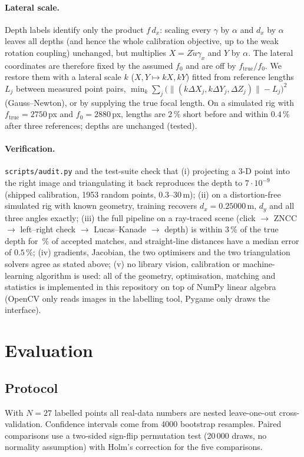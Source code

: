 \documentclass[11pt,a4paper]{article}
\newcommand{\code}[1]{\texttt{#1}}
\begin{document}
\paragraph{Lateral scale.} Depth labels identify only the product $f\,d_x$: scaling every $\gamma$ by $\alpha$ and $d_x$ by $\alpha$
leaves all depths (and hence the whole calibration objective, up to the weak rotation coupling) unchanged, but
multiplies $X=Z\tilde u\gamma_x$ and $Y$ by $\alpha$. The lateral coordinates are therefore fixed by the assumed $f_0$ and are
off by $f_\text{true}/f_0$. We restore them with a lateral scale $k$ ($X,Y\mapsto kX,kY$) fitted from reference lengths
$L_j$ between measured point pairs, $\min_k\sum_j\big(\|(k\Delta X_j,k\Delta Y_j,\Delta Z_j)\|-L_j\big)^2$ (Gauss--Newton), or
by supplying the true focal length. On a simulated rig with $f_\text{true}=2750$\,px and $f_0=2880$\,px, lengths are
$2\,\%$ short before and within $0.4\,\%$ after three references; depths are unchanged (tested).

\paragraph{Verification.} \code{scripts/audit.py} and the test-suite check that
(i) projecting a 3-D point into the right image and triangulating it back reproduces the depth to $7\cdot10^{-9}$
(shipped calibration, 1953 random points, 0.3--30\,m);
(ii) on a distortion-free simulated rig with known geometry, training recovers $d_x=0.25000$\,m, $d_y$ and all three
angles exactly;
(iii) the full pipeline on a ray-traced scene (click $\to$ ZNCC $\to$ left--right check $\to$ Lucas--Kanade $\to$ depth)
is within 3\,\% of the true depth for \MatchPrec\,\% of accepted matches, and straight-line distances have a median
error of $0.5\,\%$;
(iv) gradients, Jacobian, the two optimisers and the two triangulation solvers agree as stated above;
(v) no library vision, calibration or machine-learning algorithm is used: all of the geometry, optimisation,
matching and statistics is implemented in this repository on top of NumPy linear algebra (OpenCV only reads
images in the labelling tool, Pygame only draws the interface).

\section{Evaluation}\label{sec:eval}
\subsection{Protocol}
With $N=27$ labelled points all real-data numbers are nested leave-one-out cross-validation. Confidence intervals
come from 4000 bootstrap resamples. Paired comparisons use a two-sided sign-flip permutation test (20\,000
draws, no normality assumption) with Holm's correction for the five comparisons.
\end{document}
